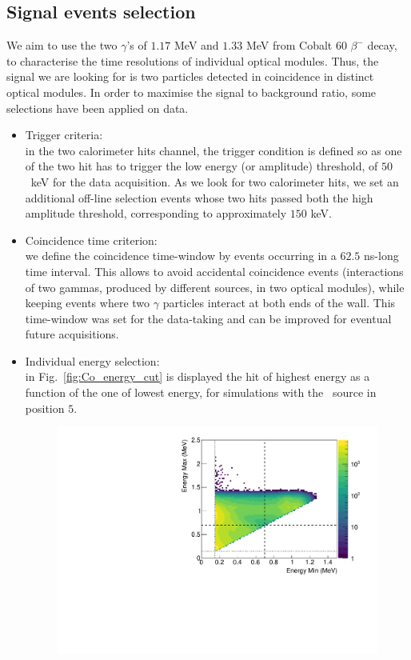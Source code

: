 \subsection{Signal events selection}
\label{subsec:Co_datacut}

We aim to use the two $\gamma$'s of $1.17$ MeV and $1.33$ MeV from Cobalt $60$ $\beta^{-}$ decay, to characterise the time resolutions of individual optical modules.
Thus, the signal we are looking for is two particles detected in coincidence in distinct optical modules.
In order to maximise the signal to background ratio, some selections have been applied on data.
\begin{itemize}
\item Trigger criteria:\\ in the two calorimeter hits channel, the trigger condition is defined so as one of the two hit has to trigger the low energy (or amplitude) threshold, of $50$~keV for the data acquisition.
  As we look for two calorimeter hits, we set an additional off-line selection events whose two hits passed both the high amplitude threshold, corresponding to approximately $150$ keV.
\item Coincidence time criterion:\\ we define the coincidence time-window by events occurring in a $62.5$ ns-long time interval.
  This allows to avoid accidental coincidence events (interactions of two gammas, produced by different sources, in two optical modules), while keeping events where two $\gamma$ particles interact at both ends of the wall.
  This time-window was set for the data-taking and can be improved for eventual future acquisitions.
\item Individual energy selection:\\ in Fig.~\ref{fig:Co_energy_cut} is displayed the hit of highest energy as a function of the one of lowest energy, for simulations with the \Co\ source in position $5$.
  \begin{figure}[h]
    \centering
    \includegraphics[width=14cm]{commissioning/fig_commissioning/Co_energy_cut.pdf}

\end{figure}
\end{itemize}
